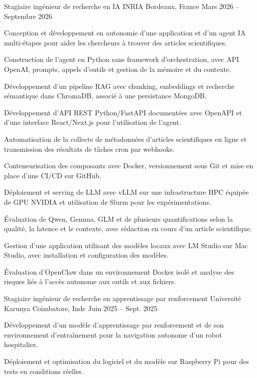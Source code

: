 
\begin{cventries}
  \cventry
    {Stagiaire ingénieur de recherche en IA}
    {INRIA}
    {Bordeaux, France}
    {Mars 2026 -- Septembre 2026}
    {
      \begin{cvitems}
        \item {Conception et développement en autonomie d’une application et d’un agent IA multi-étapes pour aider les chercheurs à trouver des articles scientifiques.}
        \item {Construction de l’agent en Python sans framework d’orchestration, avec API OpenAI, prompts, appels d’outils et gestion de la mémoire et du contexte.}
        \item {Développement d’un pipeline RAG avec chunking, embeddings et recherche sémantique dans ChromaDB, associé à une persistance MongoDB.}
        \item {Développement d’API REST Python/FastAPI documentées avec OpenAPI et d’une interface React/Next.js pour l’utilisation de l’agent.}
        \item {Automatisation de la collecte de métadonnées d’articles scientifiques en ligne et transmission des résultats de tâches cron par webhooks.}
        \item {Conteneurisation des composants avec Docker, versionnement sous Git et mise en place d’une CI/CD sur GitHub.}
        \item {Déploiement et serving de LLM avec vLLM sur une infrastructure HPC équipée de GPU NVIDIA et utilisation de Slurm pour les expérimentations.}
        \item {Évaluation de Qwen, Gemma, GLM et de plusieurs quantifications selon la qualité, la latence et le contexte, avec rédaction en cours d’un article scientifique.}
        \item {Gestion d’une application utilisant des modèles locaux avec LM Studio sur Mac Studio, avec installation et configuration des modèles.}
        \item {Évaluation d’OpenClaw dans un environnement Docker isolé et analyse des risques liés à l’accès autonome aux outils et aux fichiers.}
      \end{cvitems}
    }

  \cventry
    {Stagiaire ingénieur de recherche en apprentissage par renforcement}
    {Université Karunya}
    {Coimbatore, Inde}
    {Juin 2025 -- Sept. 2025}
    {
      \begin{cvitems}
        \item {Développement d’un modèle d’apprentissage par renforcement et de son environnement d’entraînement pour la navigation autonome d’un robot hospitalier.}
        \item {Déploiement et optimisation du logiciel et du modèle sur Raspberry Pi pour des tests en conditions réelles.}
      \end{cvitems}
    }
\end{cventries}
